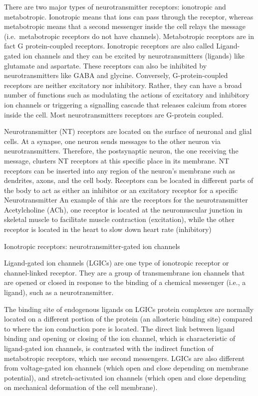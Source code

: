 \documentclass[]{book}
\begin{document}
There are two major types of neurotransmitter receptors: ionotropic and metabotropic. Ionotropic means that ions can pass through the receptor, whereas metabotropic means that a second messenger inside the cell relays the message (i.e.~metabotropic receptors do not have channels). Metabotropic receptors are in fact G protein-coupled receptors. Ionotropic receptors are also called Ligand-gated ion channels and they can be excited by neurotransmitters (ligands) like glutamate and aspartate. These receptors can also be inhibited by neurotransmitters like GABA and glycine. Conversely, G-protein-coupled receptors are neither excitatory nor inhibitory. Rather, they can have a broad number of functions such as modulating the actions of excitatory and inhibitory ion channels or triggering a signalling cascade that releases calcium from stores inside the cell. Most neurotransmitters receptors are G-protein coupled.

Neurotransmitter (NT) receptors are located on the surface of neuronal and glial cells. At a synapse, one neuron sends messages to the other neuron via neurotransmitters. Therefore, the postsynaptic neuron, the one receiving the message, clusters NT receptors at this specific place in its membrane. NT receptors can be inserted into any region of the neuron's membrane such as dendrites, axons, and the cell body. Receptors can be located in different parts of the body to act as either an inhibitor or an excitatory receptor for a specific Neurotransmitter An example of this are the receptors for the neurotransmitter Acetylcholine (ACh), one receptor is located at the neuromuscular junction in skeletal muscle to facilitate muscle contraction (excitation), while the other receptor is located in the heart to slow down heart rate (inhibitory)

Ionotropic receptors: neurotransmitter-gated ion channels

Ligand-gated ion channels (LGICs) are one type of ionotropic receptor or channel-linked receptor. They are a group of transmembrane ion channels that are opened or closed in response to the binding of a chemical messenger (i.e., a ligand), such as a neurotransmitter.

The binding site of endogenous ligands on LGICs protein complexes are normally located on a different portion of the protein (an allosteric binding site) compared to where the ion conduction pore is located. The direct link between ligand binding and opening or closing of the ion channel, which is characteristic of ligand-gated ion channels, is contrasted with the indirect function of metabotropic receptors, which use second messengers. LGICs are also different from voltage-gated ion channels (which open and close depending on membrane potential), and stretch-activated ion channels (which open and close depending on mechanical deformation of the cell membrane).
\end{document}
